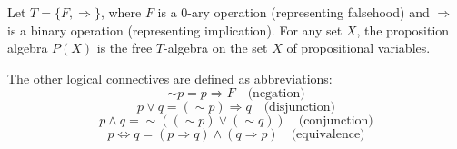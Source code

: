 Let $T = \{F, \Rightarrow\}$, where $F$ is a $0$-ary operation (representing falsehood) and $\Rightarrow$ is a binary operation (representing implication). For any set $X$, the proposition algebra $P(X)$ is the free $T$-algebra on the set $X$ of propositional variables.

The other logical connectives are defined as abbreviations:
$$\sim p = p \Rightarrow F \quad \text{(negation)}$$
$$p \lor q = (\sim p) \Rightarrow q \quad \text{(disjunction)}$$
$$p \land q = \sim((\sim p) \lor (\sim q)) \quad \text{(conjunction)}$$
$$p \Leftrightarrow q = (p \Rightarrow q) \land (q \Rightarrow p) \quad \text{(equivalence)}$$
